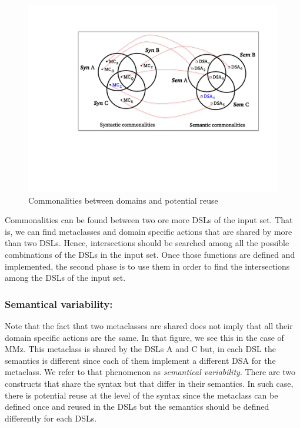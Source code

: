 \begin{figure}
\centering
\includegraphics[width=1\linewidth]{images/domains-fig.pdf}
\caption{Commonalities between domains and potential reuse}
\label{fig:domains}
\end{figure}

Commonalities can be found between two ore more DSLs of the input set. That is, we can find metaclasses and domain specific actions that are shared by more than two DSLs. Hence, intersections should be searched among all the possible combinations of the DSLs in the input set. Once those functions are defined and implemented, the second phase is to use them in order to find the intersections among the DSLs of the input set. 

\vspace{-3mm}
\subsubsection{Semantical variability:} Note that the fact that two metaclasses are shared does not imply that all their domain specific actions are the same. In that figure, we see this in the case of MMz. This metaclass is shared by the DSLs A and C but, in each DSL the semantics is different since each of them implement a different DSA for the metaclass. We refer to that phenomenon as \textit{semantical variability}. There are two constructs that share the syntax but that differ in their semantics. In such case, there is potential reuse at the level of the syntax since the metaclass can be defined once and reused in the DSLs but the semantics should be defined differently for each DSLs. 

